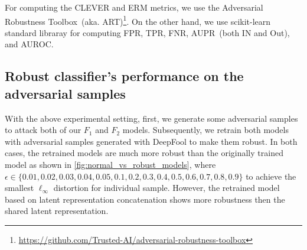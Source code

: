 \hspace*{3.5mm} For computing the CLEVER and ERM metrics, we use the Adversarial Robustness Toolbox~(aka. ART)\footnote{\url{https://github.com/Trusted-AI/adversarial-robustness-toolbox}}. On the other hand, we use scikit-learn standard libraray for computing FPR, TPR, FNR, AUPR~(both IN and Out), and AUROC. 

\subsection{Robust classifier's performance on the adversarial samples}
With the above experimental setting, first, we generate some adversarial samples to attack both of our $F_1$ and $F_2$ models. Subsequently, we retrain both models with adversarial samples generated with DeepFool to make them robust. In both cases, the retrained models are much more robust than the originally trained model as shown in \cref{fig:normal_vs_robust_models}, where $\epsilon \in\{0.01, 0.02, 0.03, 0.04, 0.05, 0.1, 0.2, 0.3, 0.4, 0.5, 0.6, 0.7, 0.8, 0.9\}$ to achieve the smallest $\ell_{\infty}$ distortion for individual sample. However, the retrained model based on latent representation concatenation shows more robustness then the shared latent representation. 

